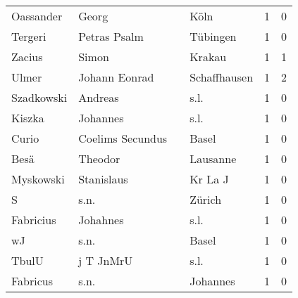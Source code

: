 \begin{tabular}{llllrr}
                Oassander &                              Georg &             &                                        Köln &          1 &         0 \\
                  Tergeri &                       Petras Psalm &             &                                    Tübingen &          1 &         0 \\
                   Zacius &                              Simon &             &                                      Krakau &          1 &         1 \\
                    Ulmer &                      Johann Eonrad &             &                                Schaffhausen &          1 &         2 \\
               Szadkowski &                            Andreas &             &                                        s.l. &          1 &         0 \\
                   Kiszka &                           Johannes &             &                                        s.l. &          1 &         0 \\
                    Curio &                   Coelims Secundus &             &                                       Basel &          1 &         0 \\
                     Besä &                            Theodor &             &                                    Lausanne &          1 &         0 \\
                Myskowski &                         Stanislaus &             &                                     Kr La J &          1 &         0 \\
                        S &                               s.n. &             &                                      Zürich &          1 &         0 \\
                Fabricius &                           Johahnes &             &                                        s.l. &          1 &         0 \\
                       wJ &                               s.n. &             &                                       Basel &          1 &         0 \\
                    TbulU &                          j T JnMrU &             &                                        s.l. &          1 &         0 \\
                 Fabricus &                               s.n. &             &                                    Johannes &          1 &         0 \\

\end{tabular}
